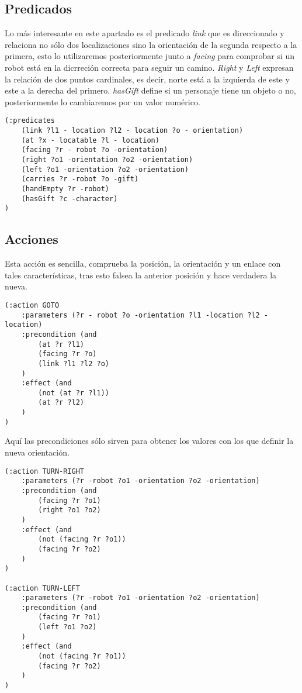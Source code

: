 \documentclass{article}
\begin{document}
\subsection{Predicados}

	Lo más interesante en este apartado es el predicado \emph{link} que es direccionado y relaciona no sólo dos localizaciones sino la orientación de la segunda respecto a la primera, esto lo utilizaremos posteriormente junto a \emph{facing} para comprobar si un robot está en la dicrreción correcta para seguir un camino. \emph{Right} y \emph{Left} expresan la relación de dos puntos cardinales, es decir, norte está a la izquierda de este y este a la derecha del primero. \emph{hasGift} define si un personaje tiene un objeto o no, posteriormente lo cambiaremos por un valor numérico.

\begin{lstlisting}
(:predicates
	(link ?l1 - location ?l2 - location ?o - orientation)
    (at ?x - locatable ?l - location)
    (facing ?r - robot ?o -orientation)
    (right ?o1 -orientation ?o2 -orientation)
    (left ?o1 -orientation ?o2 -orientation)
    (carries ?r -robot ?o -gift)
    (handEmpty ?r -robot)
    (hasGift ?c -character)
)
\end{lstlisting}

\subsection{Acciones}

Esta acción es sencilla, comprueba la posición, la orientación y un enlace con tales características, tras esto falsea la anterior posición y hace verdadera la nueva.

\begin{lstlisting}
(:action GOTO
    :parameters (?r - robot ?o -orientation ?l1 -location ?l2 -location)
    :precondition (and 
        (at ?r ?l1)
        (facing ?r ?o)
        (link ?l1 ?l2 ?o)
    )
    :effect (and 
        (not (at ?r ?l1))
        (at ?r ?l2)
    )
)
\end{lstlisting}

Aquí las precondiciones sólo sirven para obtener los valores con los que definir la nueva orientación.

\begin{lstlisting}
(:action TURN-RIGHT
    :parameters (?r -robot ?o1 -orientation ?o2 -orientation)
    :precondition (and 
        (facing ?r ?o1)
        (right ?o1 ?o2)
    )
    :effect (and 
        (not (facing ?r ?o1))
        (facing ?r ?o2)
    )
)

(:action TURN-LEFT
    :parameters (?r -robot ?o1 -orientation ?o2 -orientation)
    :precondition (and 
        (facing ?r ?o1)
        (left ?o1 ?o2)
    )
    :effect (and 
        (not (facing ?r ?o1))
        (facing ?r ?o2)
    )
)
\end{lstlisting}
\end{document}
